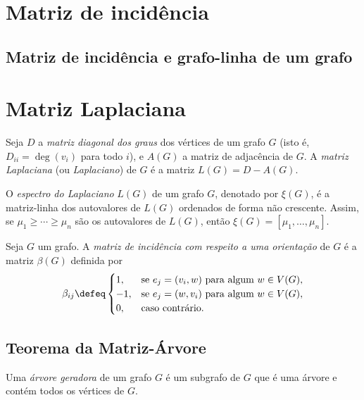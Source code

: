 \documentclass{article}
\begin{document}
\section{Matriz de incidência}

\subsection{Matriz de incidência e grafo-linha de um grafo}

\section{Matriz Laplaciana}

\begin{defn}
    Seja \(D\) a \emph{matriz diagonal dos graus} dos vértices de um grafo \(G\) (isto é, \(D_{ii} = \deg(v_i)\) para todo \(i\)), e \(A(G)\) a matriz de adjacência de \(G\). A \emph{matriz Laplaciana} (ou \emph{Laplaciano}) de \(G\) é a matriz \(L(G) = D - A(G)\).
\end{defn}

\begin{defn}
    O \emph{espectro do Laplaciano} \(L(G)\) de um grafo \(G\), denotado por \(\xi(G)\), é a matriz-linha dos autovalores de \(L(G)\) ordenados de forma não crescente. Assim, se \(\mu_1 \geq \cdots \geq \mu_n\) são os autovalores de \(L(G)\), então \(\xi(G) = [\mu_1, \ldots, \mu_n]\).
\end{defn}

\begin{defn}
    Seja \(G\) um grafo. A \emph{matriz de incidência com respeito a uma orientação} de \(G\) é a matriz \(\beta(G)\) definida por
    \[
        \beta_{ij} \defeq \begin{cases}
            1, & \text{se } e_j = (v_i, w) \text{ para algum } w \in V(G), \\
            -1, & \text{se } e_j = (w, v_i) \text{ para algum } w \in V(G), \\
            0, & \text{caso contrário}.
        \end{cases}
    \]
\end{defn}

\subsection{Teorema da Matriz-Árvore}

\begin{defn}
    Uma \emph{árvore geradora} de um grafo \(G\) é um subgrafo de \(G\) que é uma árvore e contém todos os vértices de \(G\).
\end{defn}
\end{document}
